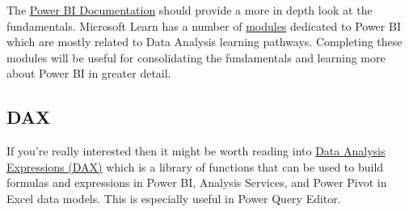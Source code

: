 \documentclass[
]{book}
\begin{document}
The \href{https://docs.microsoft.com/en-us/power-bi/fundamentals/}{Power BI Documentation} should provide a more in depth look at the fundamentals. Microsoft Learn has a number of \href{https://docs.microsoft.com/en-us/learn/modules/get-started-with-power-bi/}{modules} dedicated to Power BI which are mostly related to Data Analysis learning pathways. Completing these modules will be useful for consolidating the fundamentals and learning more about Power BI in greater detail.

\hypertarget{dax}{%
\subsection{DAX}\label{dax}}

If you're really interested then it might be worth reading into \href{https://docs.microsoft.com/en-us/dax/}{Data Analysis Expressions (DAX)} which is a library of functions that can be used to build formulas and expressions in Power BI, Analysis Services, and Power Pivot in Excel data models. This is especially useful in Power Query Editor.

  
\end{document}
